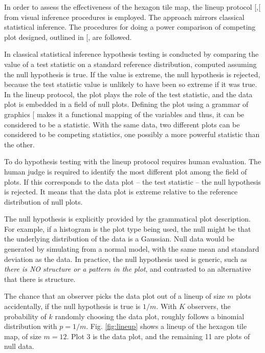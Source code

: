 \documentclass[
]{article}
\begin{document}
In order to assess the effectiveness of the hexagon tile map, the lineup
protocol {[}\citeproc{ref-GIIV}{3}{]},{[}\citeproc{ref-BCHLLSW09}{12}{]}
from visual inference procedures is employed. The approach mirrors
classical statistical inference. The procedures for doing a power
comparison of competing plot designed, outlined in
{[}\citeproc{ref-GTPCCD}{13}{]}, are followed.

In classical statistical inference hypothesis testing is conducted by
comparing the value of a test statistic on a standard reference
distribution, computed assuming the null hypothesis is true. If the
value is extreme, the null hypothesis is rejected, because the test
statistic value is unlikely to have been so extreme if it was true. In
the lineup protocol, the plot plays the role of the test statistic, and
the data plot is embedded in a field of null plots. Defining the plot
using a grammar of graphics {[}\citeproc{ref-ggplot2}{14}{]} makes it a
functional mapping of the variables and thus, it can be considered to be
a statistic. With the same data, two different plots can be considered
to be competing statistics, one possibly a more powerful statistic than
the other.

To do hypothesis testing with the lineup protocol requires human
evaluation. The human judge is required to identify the most different
plot among the field of plots. If this corresponds to the data plot --
the test statistic -- the null hypothesis is rejected. It means that the
data plot is extreme relative to the reference distribution of null
plots.

The null hypothesis is explicitly provided by the grammatical plot
description. For example, if a histogram is the plot type being used,
the null might be that the underlying distribution of the data is a
Gaussian. Null data would be generated by simulating from a normal
model, with the same mean and standard deviation as the data. In
practice, the null hypothesis used is generic, such as \emph{there is NO
structure or a pattern in the plot}, and contrasted to an alternative
that there is structure.

The chance that an observer picks the data plot out of a lineup of size
\(m\) plots accidentally, if the null hypothesis is true is \(1/m\).
With \(K\) observers, the probability of \(k\) randomly choosing the
data plot, roughly follows a binomial distribution with \(p=1/m\). Fig.
\ref{fig:lineup} shows a lineup of the hexagon tile map, of size
\(m=12\). Plot 3 is the data plot, and the remaining 11 are plots of
null data.
\end{document}
